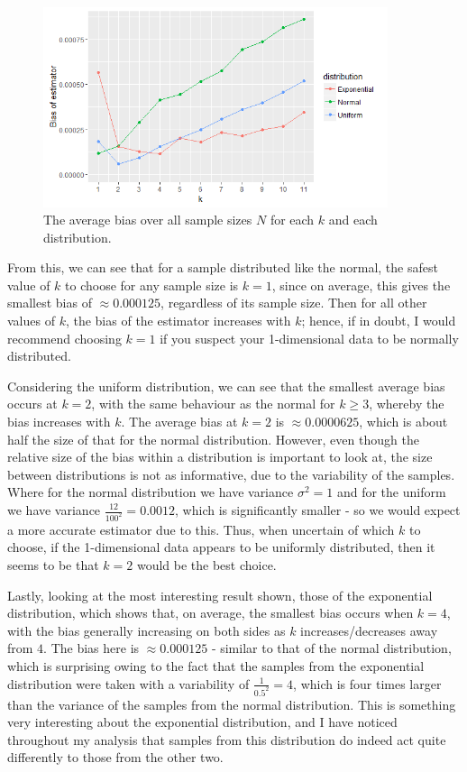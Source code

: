\documentclass[12pt]{report}
\begin{document}
\begin{figure}
  \begin{center}
    \includegraphics[width=0.9\textwidth]{./Graphs/Best/kVbiasapproxALLN.png}
  \end{center}
\caption{The average bias over all sample sizes $N$ for each $k$ and each distribution.}
  \label{k_bias_allN}
\end{figure}

From this, we can see that for a sample distributed like the normal, the safest value of $k$ to choose for any sample size is $k=1$, since on average, this gives the smallest bias of $\approx 0.000125$, regardless of its sample size. Then for all other values of $k$, the bias of the estimator increases with $k$; hence, if in doubt, I would recommend choosing $k=1$ if you suspect your 1-dimensional data to be normally distributed.

Considering the uniform distribution, we can see that the smallest average bias occurs at $k=2$, with the same behaviour as the normal for $k \geq 3$, whereby the bias increases with $k$. The average bias at $k=2$ is $\approx 0.0000625$, which is about half the size of that for the normal distribution. However, even though the relative size of the bias within a distribution is important to look at, the size between distributions is not as informative, due to the variability of the samples. Where for the normal distribution we have variance $\sigma^2 = 1$ and for the uniform we have variance $\frac{12}{100^2} = 0.0012$, which is significantly smaller - so we would expect a more accurate estimator due to this. Thus, when uncertain of which $k$ to choose, if the 1-dimensional data appears to be uniformly distributed, then it seems to be that $k=2$ would be the best choice.

Lastly, looking at the most interesting result shown, those of the exponential distribution, which shows that, on average, the smallest bias occurs when $k=4$, with the bias generally increasing on both sides as $k$ increases/decreases away from $4$. The bias here is $\approx 0.000125$ - similar to that of the normal distribution, which is surprising owing to the fact that the samples from the exponential distribution were taken with a variability of $\frac{1}{0.5^2} = 4$, which is four times larger than the variance of the samples from the normal distribution. This is something very interesting about the exponential distribution, and I have noticed throughout my analysis that samples from this distribution do indeed act quite differently to those from the other two.
\end{document}
